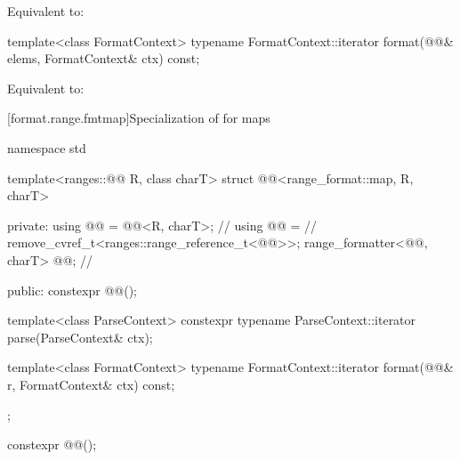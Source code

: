 \begin{itemdescr}
\pnum
\effects
Equivalent to: 
\end{itemdescr}

%
\begin{itemdecl}
template<class FormatContext>
  typename FormatContext::iterator
    format(@@& elems, FormatContext& ctx) const;
\end{itemdecl}

\begin{itemdescr}
\pnum
\effects
Equivalent to: 
\end{itemdescr}

[format.range.fmtmap]{Specialization of  for maps}

%
\begin{codeblock}
namespace std {
  template<ranges::@@ R, class charT>
  struct @@<range_format::map, R, charT> {
  private:
    using @@ = @@<R, charT>;                  // \expos
    using @@ =                                                // \expos
      remove_cvref_t<ranges::range_reference_t<@@>>;
    range_formatter<@@, charT> @@;                   // \expos

  public:
    constexpr @@();

    template<class ParseContext>
      constexpr typename ParseContext::iterator
        parse(ParseContext& ctx);

    template<class FormatContext>
      typename FormatContext::iterator
        format(@@& r, FormatContext& ctx) const;
  };
}
\end{codeblock}

%
\begin{itemdecl}
constexpr @@();
\end{itemdecl}

